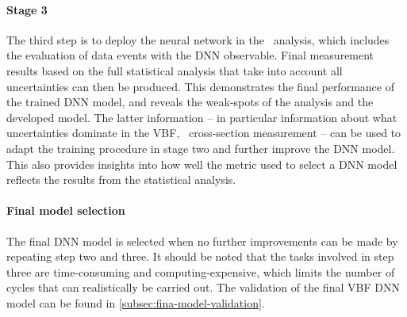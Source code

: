 \paragraph{Stage 3}
The third step is to deploy the neural network in the \HWW\ analysis, which includes the evaluation of data events with the DNN observable. Final measurement results based on the full statistical analysis that take into account all uncertainties can then be produced. This demonstrates the final performance of the trained DNN model, and reveals the weak-spots of the analysis and the developed model.
The latter information -- in particular information about what uncertainties dominate in the VBF, \HWW\ cross-section measurement -- can be used to adapt the training procedure in stage two and further improve the DNN model.
This also provides insights into how well the metric used to select a DNN model reflects the results from the statistical analysis.

\paragraph{Final model selection}
The final DNN model is selected when no further improvements can be made by repeating step two and three. It should be noted that the tasks involved in step three are time-consuming and computing-expensive, which limits the number of cycles that can realistically be carried out.
The validation of the final VBF DNN model can be found in \cref{subsec:fina-model-validation}. 




